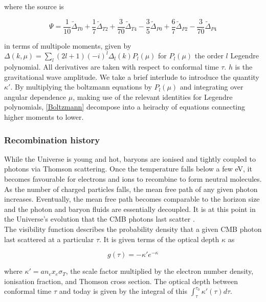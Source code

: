 \documentclass[a4paper,10pt]{article}
\begin{document}
where the source is

\begin{equation}
\Psi = \frac{1}{10}\tilde{\Delta}_{T0} + \frac{1}{7}\tilde{\Delta}_{T2} + \frac{3}{70}\tilde{\Delta}_{T4} - \frac{3}{5}\tilde{\Delta}_{P0} + \frac{6}{7}\tilde{\Delta}_{P2} - \frac{3}{70}\tilde{\Delta}_{P4}
\end{equation}

in terms of multipole moments, given by $\Delta(k, \mu) = \sum_l (2l+1)(-i)^l\Delta_l(k)P_l(\mu)$ for $P_l(\mu)$ the order $l$ Legendre polynomial. All derivatives are taken with respect to conformal time $\tau$. $h$ is the gravitational wave amplitude. We take a brief interlude to introduce the quantity $\kappa'$. By multiplying the boltzmann equations by $P_l(\mu)$ and integrating over angular dependence $\mu$, making use of the relevant identities for Legendre polynomials, \ref{Boltzmann} decompose  into a heirachy of equations connecting higher moments to lower.

\subsubsection{Recombination history}

While the Universe is young and hot, baryons are ionised and tightly coupled to photons via Thomson scattering. Once the temperature falls below a few eV, it becomes favourable for electrons and ions to recombine to form neutral molecules. As the number of charged particles falls, the mean free path of any given photon increases. Eventually, the mean free path becomes comparable to the horizon size and the photon and baryon fluids are essentially decoupled. It is at this point in the Universe’s evolution that the CMB photons last scatter \cite{Pritchard}.\\

The visibility function describes the probability density that a given CMB photon last scattered at a particular $\tau$. It is given terms of the optical depth $\kappa$ as

\begin{equation}
g(\tau) = -\kappa'e^{-\kappa}
\end{equation}

where $\kappa' = an_ex_e\sigma_T$, the scale factor multiplied by the electron number density, ionisation fraction, and Thomson cross section. The optical depth between conformal time $\tau$ and today is given by the integral of this $\int_\tau^{\tau_0} \kappa'(\tau)d\tau$.\\
\end{document}
